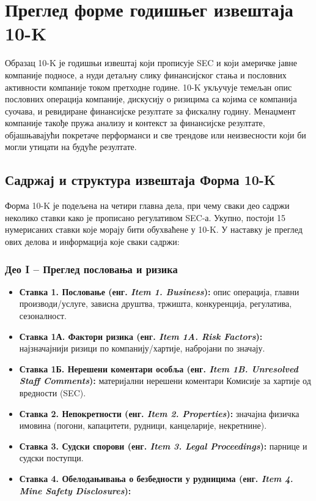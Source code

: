 \section{Преглед форме годишњег извештаја 10-K}

Образац 10-K је годишњи извештај који прописује SEC и који америчке јавне компаније подносе, а нуди детаљну слику финансијског стања и пословних активности компаније током претходне године. 10-K укључује темељан опис пословних операција компаније, дискусију о ризицима са којима се компанија суочава, и ревидиране финансијске резултате за фискалну годину. Менаџмент компаније такође пружа анализу и контекст за финансијске резултате, објашњавајући покретаче перформанси и све трендове или неизвесности који би могли утицати на будуће резултате.

\subsection{Садржај и структура извештаја Форма 10-K}

Форма 10-K је подељена на четири главна дела, при чему сваки део садржи неколико ставки како је прописано регулативом SEC-а. Укупно, постоји 15 нумерисаних ставки које морају бити обухваћене у 10-K. У наставку је преглед ових делова и информација које сваки садржи:

\subsubsection{Део I – Преглед пословања и ризика}

\begin{itemize}
\item \textbf{Ставка 1. Пословање (енг. \textit{Item 1. Business}):} опис операција, главни производи/услуге, зависна друштва, тржишта, конкуренција, регулатива, сезоналност.

\item \textbf{Ставка 1А. Фактори ризика (енг. \textit{Item 1A. Risk Factors}):} најзначајнији ризици по компанију/хартије, набројани по значају.

\item \textbf{Ставка 1Б. Нерешени коментари особља (енг. \textit{Item 1B. Unresolved Staff Comments}):} материјални нерешени коментари Комисије за хартије од вредности (SEC).

\item \textbf{Ставка 2. Непокретности (енг. \textit{Item 2. Properties}):} значајна физичка имовина (погони, капацитети, рудници, канцеларије, некретнине).

\item \textbf{Ставка 3. Судски спорови (енг. \textit{Item 3. Legal Proceedings}):} парнице и судски поступци.

\item \textbf{Ставка 4. Обелодањивања о безбедности у рудницима (енг. \textit{Item 4. Mine Safety Disclosures}):}
\end{itemize}

